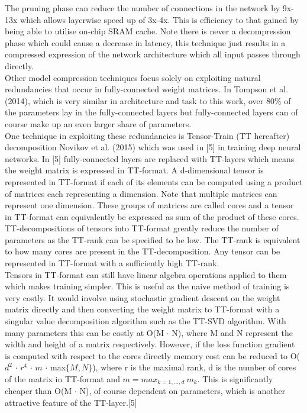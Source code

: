 \documentclass{article}
\begin{document}
The pruning phase can reduce the number of connections in the network by 9x-13x which allows layerwise speed up of 3x-4x. This is efficiency to that gained by being able to utilise on-chip SRAM cache. Note there is never a decompression phase which could cause a decrease in latency, this technique just results in a compressed expression of the network architecture which all input passes through directly.\\

Other model compression techniques focus solely on exploiting natural redundancies that occur in fully-connected weight matrices. In Tompson et al. (2014), which is very similar in architecture and task to this work, over 80\% of the parameters lay in the fully-connected layers but fully-connected layers can of course make up an even larger share of parameters.\\

One technique in exploiting these redundancies is Tensor-Train (TT hereafter) decomposition Novikov et al. (2015) which was used in [5] in training deep neural networks. In [5] fully-connected layers are replaced with TT-layers which means the weight matrix is expressed in TT-format. A d-dimensional tensor is represented in TT-format if each of its elements can be computed using a product of matrices each representing a dimension. Note that multiple matrices can represent one dimension. These groups of matrices are called cores and a tensor in TT-format can equivalently be expressed as sum of the product of these cores. \\

TT-decompositions of tensors into TT-format greatly reduce the number of parameters as the TT-rank can be specified to be low. The TT-rank is equivalent to how many cores are present in the TT-decomposition. Any tensor can be represented in TT-format with a sufficiently high TT-rank.\\

Tensors in TT-format can still have linear algebra operations applied to them which makes training simpler. This is useful as the naive method of training is very costly. It would involve using stochastic gradient descent on the weight matrix directly and then converting the weight matrix to TT-format with a singular value decomposition algorithm such as the TT-SVD algorithm. With many parameters this can be costly at O(M $\cdot$ N), where M and N represent the width and height of a matrix respectively. However, if the loss function gradient is computed with respect to the cores directly memory cost can be reduced to O($d^2$ $\cdot$ $r^4$ $\cdot$ $m$ $\cdot$ max$\{M, N\}$), where r is the maximal rank, d is the number of cores of the matrix in TT-format and $m = max_{k=1,...,d} \ m_k$. This is significantly cheaper than O(M $\cdot$ N), of course dependent on parameters, which is another attractive feature of the TT-layer.[5]\\
\end{document}
